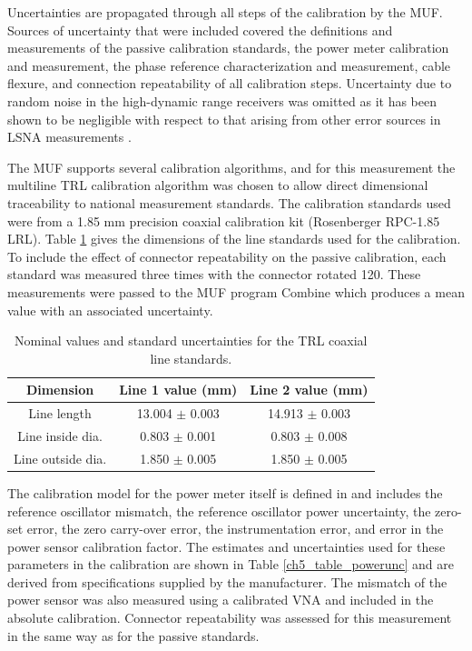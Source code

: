 \documentclass[../thesis/thesis.tex]{subfiles}
\begin{document}
Uncertainties are propagated through all steps of the calibration by the MUF. Sources of uncertainty that were included covered the definitions and measurements of the passive calibration standards, the power meter calibration and measurement, the phase reference characterization and measurement, cable flexure, and connection repeatability of all calibration steps. Uncertainty due to random noise in the high-dynamic range receivers was omitted as it has been shown to be negligible with respect to that arising from other error sources in LSNA measurements \cite{Blockley_2007}.

The MUF supports several calibration algorithms, and for this measurement the multiline TRL calibration algorithm \cite{Engen_1979, Marks_1991} was chosen to allow direct dimensional traceability to national measurement standards. The calibration standards used were from a 1.85 mm precision coaxial calibration kit (Rosenberger RPC-1.85 LRL). Table \ref{ch5_table_passivestds} gives the dimensions of the line standards used for the calibration. To include the effect of connector repeatability on the passive calibration, each standard was measured three times with the connector rotated 120\textdegree. These measurements were passed to the MUF program Combine which produces a mean value with an associated uncertainty.

\begin{table}[]
	\centering
	\caption{Nominal values and standard uncertainties for the TRL coaxial line standards.}
	\label{ch5_table_passivestds}
	\begin{tabular}{ccc}
		\hline
		Dimension         & Line 1 value (mm) & Line 2 value (mm) \\ \hline
		Line length       & 13.004 $\pm$ 0.003 & 14.913 $\pm$ 0.003 \\
		Line inside dia.  & 0.803 $\pm$ 0.001 & 0.803 $\pm$ 0.008 \\
		Line outside dia. & 1.850 $\pm$ 0.005 & 1.850 $\pm$ 0.005 \\ \hline            
	\end{tabular}
\end{table}

The calibration model for the power meter itself is defined in \cite{Keysight_2017} and includes the reference oscillator mismatch, the reference oscillator power uncertainty, the zero-set error, the zero carry-over error, the instrumentation error, and error in the power sensor calibration factor. The estimates and uncertainties used for these parameters in the calibration are shown in Table \ref{ch5_table_powerunc} and are derived from specifications supplied by the manufacturer. The mismatch of the power sensor was also measured using a calibrated VNA and included in the absolute calibration. Connector repeatability was assessed for this measurement in the same way as for the passive standards.
\end{document}
